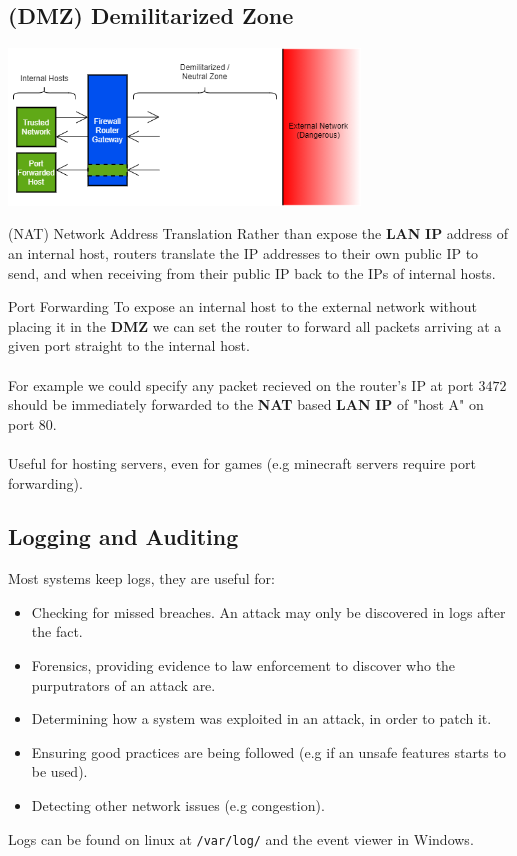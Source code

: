 \subsection{(DMZ) Demilitarized Zone}
\begin{center}\includegraphics[width=0.7\textwidth]{network_security/images/DMZ.png}\end{center}
\begin{definitionbox}{(NAT) Network Address Translation}
    Rather than expose the \textbf{LAN} \textbf{IP} address of an internal host, routers translate the IP addresses to their own public IP to send, and when receiving from their public IP back to the IPs of internal hosts.
\end{definitionbox}
\begin{definitionbox}{Port Forwarding}
    To expose an internal host to the external network without placing it in the \textbf{DMZ} we can set the router to forward all packets arriving at a given port straight to the internal host.
    \\
    \\ For example we could specify any packet recieved on the router's IP at port $3472$ should be immediately forwarded to the \textbf{NAT} based \textbf{LAN} \textbf{IP} of "host A" on port 80.
    \\
    \\ Useful for hosting servers, even for games (e.g minecraft servers require port forwarding).
\end{definitionbox}
\subsection{Logging and Auditing}
Most systems keep logs, they are useful for:
\begin{itemize}
    \setlength\itemsep{0em}
    \item Checking for missed breaches. An attack may only be discovered in logs after the fact.
    \item Forensics, providing evidence to law enforcement to discover who the purputrators of an attack are.
    \item Determining how a system was exploited in an attack, in order to patch it.
    \item Ensuring good practices are being followed (e.g if an unsafe features starts to be used).
    \item Detecting other network issues (e.g congestion).
\end{itemize}
Logs can be found on linux at \lstinline{/var/log/} and the event viewer in Windows.

